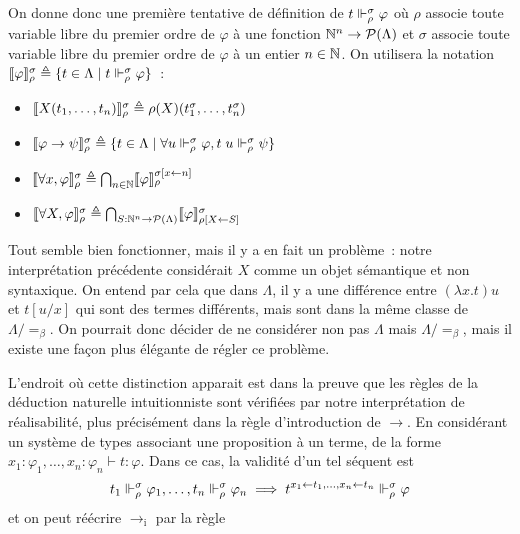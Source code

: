 \documentclass{article}
\begin{document}
On donne donc une première tentative de définition de $t\reali_\rho^\sigma \varphi$ où $\rho$ associe toute variable libre du premier ordre de $\varphi$ à une fonction $\bN^n \to \mathcal P(\Lambda)$ et $\sigma$ associe toute variable libre du premier ordre de $\varphi$ à un entier $n \in \bN$. On utilisera la notation $\trad\varphi_\rho^\sigma \defeq \{t\in\Lambda\mid t \reali_\rho^\sigma \varphi\}$~:
\begin{itemize}
\item $\trad{X(t_1,\ldots,t_n)}_\rho^\sigma \defeq \rho(X)(t_1^\sigma,\ldots,t_n^\sigma)$
\item $\trad{\varphi \to \psi}_\rho^\sigma\defeq \{t\in \Lambda \mid \forall u\reali_\rho^\sigma \varphi, t\;u\reali_\rho^\sigma \psi\}$
\item $\trad{\forall x, \varphi}_\rho^\sigma \defeq \bigcap_{n \in \bN}\trad\varphi_\rho^{\sigma[x\leftarrow n]}$
\item $\trad{\forall X, \varphi}_\rho^\sigma \defeq \bigcap_{S : \bN^n \to \mathcal P(\Lambda)}\trad\varphi_{\rho[X\leftarrow S]}^\sigma$
\end{itemize}

Tout semble bien fonctionner, mais il y a en fait un problème~: notre interprétation précédente considérait $X$ comme un objet sémantique et non syntaxique. On entend par cela que dans $\Lambda$, il y a une différence entre $(\lambda x.t)u$ et $t[u/x]$ qui sont des termes différents, mais sont dans la même classe de $\Lambda/=_\beta$. On pourrait donc décider de ne considérer non pas $\Lambda$ mais $\Lambda/=_\beta$, mais il existe une façon plus élégante de régler ce problème.

L'endroit où cette distinction apparait est dans la preuve que les règles de la déduction naturelle intuitionniste sont vérifiées par notre interprétation de réalisabilité, plus précisément dans la règle d'introduction de $\to$. En considérant un système de types associant une proposition à un terme, de la forme $x_1 : \varphi_1,\ldots,x_n : \varphi_n \vdash t : \varphi$. Dans ce cas, la validité d'un tel séquent est
\[t_1\reali_\rho^\sigma \varphi_1,\ldots,t_n \reali_\rho^\sigma \varphi_n \implies t^{x_1 \leftarrow t_1,\ldots, x_n\leftarrow t_n}\reali_\rho^\sigma \varphi\]
et on peut réécrire $\to_\mathrm i$ par la règle
\begin{center}
  \begin{prooftree}
  \end{prooftree}
\end{center}
\end{document}
